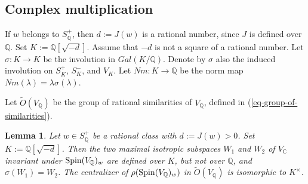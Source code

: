 \documentclass[12pt]{amsart}
\numberwithin{equation}{subsection}
\theoremstyle{plain}
\newtheorem{lem}[thm]{Lemma}
\theoremstyle{definition}
\newcommand{\CC}{{\mathbb C}}
\newcommand{\QQ}{{\mathbb Q}}
\newcommand{\Spin}{{\rm Spin}}
\begin{document}
% 
\subsection{Complex multiplication}
If $w$ belongs to $S^+_\QQ$, then $d:=J(w)$ is a rational number, since $J$ is defined over $\QQ$. Set $K:=\QQ[\sqrt{-d}]$. 
Assume that $-d$ is not a square of a rational number.
Let $\sigma: K\rightarrow K$ be the involution in $Gal(K/\QQ)$. Denote by $\sigma$ also the induced involution on $S^+_K$, $S^-_K$, and $V_K$. 
Let $Nm:K\rightarrow\QQ$ be the norm map $Nm(\lambda)=\lambda\sigma(\lambda)$.

Let $\tilde{O}(V_\QQ)$ be the group of rational similarities of $V_\QQ$, defined in (\ref{eq-group-of-similarities}).


\begin{lem}
\label{lemma-imaginary-quadratic-field-is-centralizer-sixfold-case}
Let $w\in S^+_\QQ$ be a rational class with $d:=J(w)> 0$. Set $K:=\QQ[\sqrt{-d}]$. 
Then the two maximal isotropic subspaces $W_1$ and $W_2$ of $V_\CC$ invariant under $\Spin(V_\QQ)_w$ are defined over $K$, but not over $\QQ$, and $\sigma(W_1)=W_2$. The centralizer of $\rho(\Spin(V_\QQ)_w)$ in $\tilde{O}(V_\QQ)$
is isomorphic to $K^\times$.
\end{lem}
\end{document}
